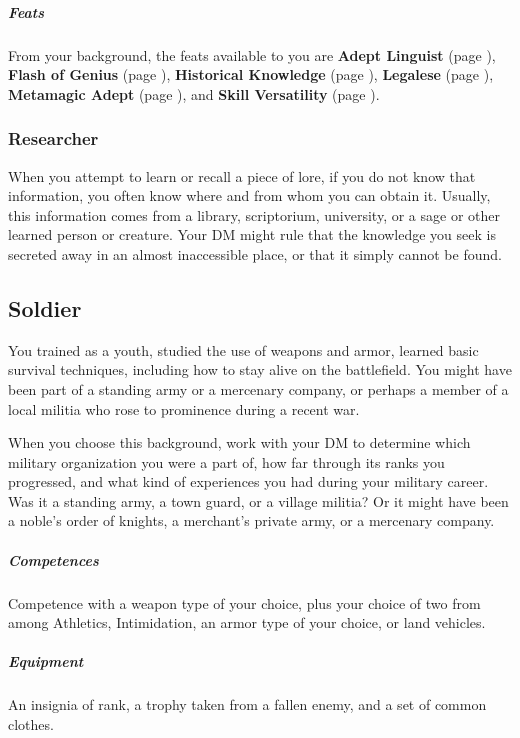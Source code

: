     \subparagraph{Feats} From your background, the feats available to you are
    \textbf{Adept Linguist} (page \pageref{feat::adeptlinguist}),
    \textbf{Flash of Genius} (page \pageref{feat::flashofgenius}),
    \textbf{Historical Knowledge} (page \pageref{feat::historicalknowledge}),
    \textbf{Legalese} (page \pageref{feat::legalese}),
    \textbf{Metamagic Adept} (page \pageref{feat::metamagicadept}), and
    \textbf{Skill Versatility} (page \pageref{feat::skillversatility}).

    \subsubsection{Researcher} \label{feat::researcher}
        When you attempt to learn or recall a piece of lore, if you do not know that information, you often know where and from whom you can obtain it.
        Usually, this information comes from a library, scriptorium, university, or a sage or other learned person or creature.
        Your DM might rule that the knowledge you seek is secreted away in an almost inaccessible place, or that it simply cannot be found.

\subsection*{Soldier} \label{ssec::soldier}
    You trained as a youth, studied the use of weapons and armor, learned basic survival techniques, including how to stay alive on the battlefield.
    You might have been part of a standing army or a mercenary company, or perhaps a member of a local militia who rose to prominence during a recent war.

    When you choose this background, work with your DM to determine which military organization you were a part of, how far through its ranks you progressed, and what kind of experiences you had during your military career.
    Was it a standing army, a town guard, or a village militia?
    Or it might have been a noble's order of knights, a merchant's private army, or a mercenary company.

    \subparagraph{Competences} Competence with a weapon type of your choice, plus your choice of two from among Athletics, Intimidation, an armor type of your choice, or land vehicles.

    \subparagraph{Equipment} An insignia of rank, a trophy taken from a fallen enemy, and a set of common clothes.

